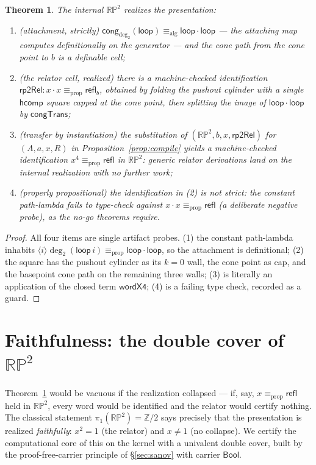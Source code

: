 \documentclass[11pt]{amsart}
\newtheorem{thm}{Theorem}[section]
\theoremstyle{definition}
\newcommand{\aconv}{\equiv_{\mathrm{alg}}}
\newcommand{\propeq}{\equiv_{\mathrm{prop}}}
\newcommand{\refl}{\mathsf{refl}}
\newcommand{\hcomp}{\mathsf{hcomp}}
\newcommand{\cng}{\mathsf{cong}}
\newcommand{\trns}{\mathbin{\cdot}}
\newcommand{\RP}{\mathbb{RP}^2}
\begin{document}
\begin{thm}
  \label{thm:realize}
  The internal $\RP$ realizes the presentation:
  \begin{enumerate}
  \item (\emph{attachment, strictly}) $\cng_{\deg_2}(\mathsf{loop})
    \aconv \mathsf{loop} \trns \mathsf{loop}$ --- the attaching map
    computes definitionally on the generator ---
    and the cone path from the cone point to $b$ is a definable
    cell;
  \item (\emph{the relator cell, realized}) there is a
    machine-checked identification
    $\mathsf{rp2Rel} : x \trns x \propeq \refl_b$, obtained by
    folding the pushout cylinder with a single $\hcomp$ square
    capped at the cone point, then splitting the image of
    $\mathsf{loop}\trns\mathsf{loop}$ by $\mathsf{congTrans}$;
  \item (\emph{transfer by instantiation}) the substitution of
    $(\RP, b, x, \mathsf{rp2Rel})$ for
    $(A, a, x, R)$ in Proposition~\ref{prop:compile} yields a
    machine-checked identification $x^4 \propeq \refl$ in $\RP$:
    generic relator derivations land on the internal realization
    with no further work;
  \item (\emph{properly propositional}) the identification in (2)
    is not strict: the constant path-lambda fails to type-check
    against $x \trns x \propeq \refl$ (a deliberate negative probe),
    as the no-go theorems require.
  \end{enumerate}
\end{thm}

\begin{proof}
  All four items are single artifact probes.  (1) the constant
  path-lambda inhabits
  $\langle i\rangle \deg_2(\mathsf{loop}\,i) \propeq
  \mathsf{loop}\trns\mathsf{loop}$, so the attachment is
  definitional; (2) the square has the pushout cylinder as its
  $k{=}0$ wall, the cone point as cap, and the basepoint cone path
  on the remaining three walls; (3) is literally an application of
  the closed term $\mathsf{wordX4}$; (4) is a failing type check,
  recorded as a guard.
\end{proof}

\section{Faithfulness: the double cover of $\RP$}
\label{sec:cover}

Theorem~\ref{thm:realize} would be vacuous if the realization
collapsed --- if, say, $x \propeq \refl$ held in $\RP$, every word
would be identified and the relator would certify nothing.  The
classical statement $\pi_1(\RP) = \mathbb{Z}/2$ says precisely that
the presentation is realized \emph{faithfully}: $x^2 = 1$ (the
relator) and $x \neq 1$ (no collapse).  We certify the computational
core of this on the kernel with a univalent double cover, built by
the proof-free-carrier principle of \S\ref{sec:sanov} with carrier
$\mathsf{Bool}$.
\end{document}

